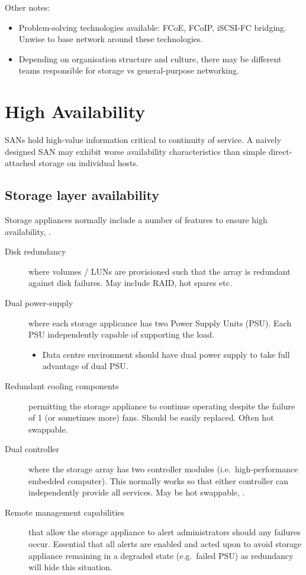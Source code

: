 Other notes:

\begin{itemize}
\item
  Problem-solving technologies available: FCoE, FCoIP, iSCSI-FC
  bridging. Unwise to base network around these technologies.
\item
  Depending on organisation structure and culture, there may be
  different teams responsible for storage vs general-purpose networking.
\end{itemize}

\section{High Availability}
\label{sec:high-availability}

SANs hold high-value information critical to continuity of service. A
naively designed SAN may exhibit worse availability characteristics than
simple direct-attached storage on individual hosts.

\subsection{Storage layer availability}
\label{sec:storage-layer-availability}

Storage appliances normally include a number of features to ensure high
availability, .

\begin{description}
\item[Disk redundancy]
where volumes / LUNs are provisioned such that the array is redundant
against disk failures. May include RAID, hot spares etc.
\item[Dual power-supply]
where each storage applicance has two Power Supply Units (PSU). Each PSU
independently capable of supporting the load.

\begin{itemize}

\item
  Data centre environment should have dual power supply to take full
  advantage of dual PSU.
\end{itemize}
\item[Redundant cooling components]
permitting the storage appliance to continue operating despite the
failure of 1 (or sometimes more) fans. Should be easily replaced. Often
hot swappable.
\item[Dual controller]
where the storage array has two controller modules
(i.e.~high-performance embedded computer). This normally works so that
either controller can independently provide all services. May be hot
swappable, .
\item[Remote management capabilities]
that allow the storage appliance to alert administrators should any
failures occur. Essential that all alerts are enabled and acted upon to
avoid storage appliance remaining in a degraded state (e.g.~failed PSU)
as redundancy will hide this situation.
\end{description}

